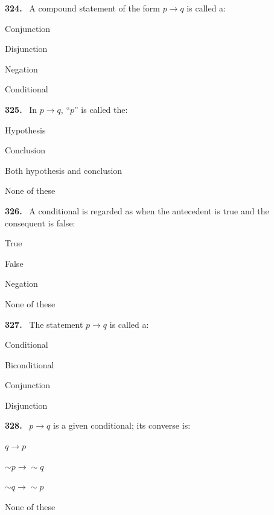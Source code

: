 \documentclass[11pt]{article}
\newenvironment{qenv}[1]{%
  \par\medskip\noindent\textbf{#1.}\ \ignorespaces
}{\par}
\begin{document}
\begin{qenv}{324} A compound statement of the form $p \to q$ is called a:
\begin{options} \item Conjunction \item Disjunction \item Negation \item Conditional \end{options} \end{qenv}

\begin{qenv}{325} In $p \to q$, ``$p$'' is called the:
\begin{options} \item Hypothesis \item Conclusion \item Both hypothesis and conclusion \item None of these \end{options} \end{qenv}

\begin{qenv}{326} A conditional is regarded as \underline{\hspace{2cm}} when the antecedent is true and the consequent is false:
\begin{options} \item True \item False \item Negation \item None of these \end{options} \end{qenv}

\begin{qenv}{327} The statement $p \to q$ is called a:
\begin{options} \item Conditional \item Biconditional \item Conjunction \item Disjunction \end{options} \end{qenv}

\begin{qenv}{328} $p \to q$ is a given conditional; its converse is:
\begin{options} \item $q \to p$ \item $\sim p \to \sim q$ \item $\sim q \to \sim p$ \item None of these \end{options} \end{qenv}
\end{document}
